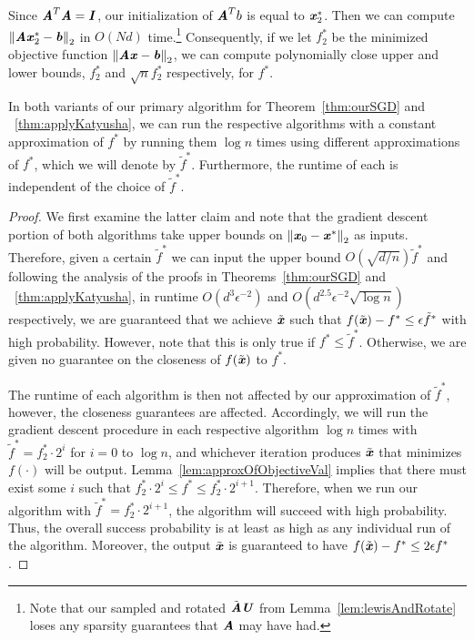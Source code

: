 Since $\AA^T \AA = \II$, our initialization of $\AA^T b$ is equal to $\xx_2^*$. Then we can compute $\norme{\AA\xx_2^* - \bb}$ in $O(Nd)$ time.\footnote{Note that our sampled and rotated $\tilde{\AA}\UU$ from Lemma~\ref{lem:lewisAndRotate} loses any sparsity guarantees that $\AA$ may have had.} Consequently, if we let $f_2^*$ be the minimized objective function $\norme{\AA\xx - \bb}$, we can compute polynomially close upper and lower bounds, $f_2^*$ and $\sqrt{n}f_2^*$ respectively, for $f^*$.

\begin{lemma}\label{lem:binarySearch}
	In both variants of our primary algorithm for Theorem~\ref{thm:ourSGD} and ~\ref{thm:applyKatyusha}, we can run the respective algorithms with a constant approximation of $f^*$ by running them $\log{n}$ times using different approximations of $f^*$, which we will denote by $\tilde{f}^*$.
	Furthermore, the runtime of each is independent of the choice of $\tilde{f}^*$.
\end{lemma}

\begin{proof}
	We first examine the latter claim and note that the gradient descent portion of both algorithms take upper bounds on $\norme{\xx_0 - \xx^*}$ as inputs.
	Therefore, given a certain $\tilde{f}^*$ we can input the upper bound $O(\sqrt{d/n})\tilde{f}^*$ and following the analysis of the proofs in Theorems~\ref{thm:ourSGD} and ~\ref{thm:applyKatyusha},
	in runtime $O(d^3\epsilon^{-2})$ and $O\left(d^{2.5}\epsilon^{-2} \sqrt{\log{n}}\right)$ respectively,
	we are guaranteed that we achieve $\tilde{\xx}$ such that $f(\tilde{\xx}) - f^* \leq \epsilon \tilde{f}^*$ with high probability.
	However, note that this is only true if $f^* \leq \tilde{f}^*$.
	Otherwise, we are given no guarantee on the closeness of $f(\tilde{\xx})$ to $f^*$.
	
	The runtime of each algorithm is then not affected by our approximation of $\tilde{f}^*$, however, the closeness guarantees are affected.
	Accordingly, we will run the gradient descent procedure in each respective algorithm $\log {n}$ times with $\tilde{f}^* = f_2^* \cdot 2^i$ for $i = 0$ to $\log {n}$, and whichever iteration produces $\tilde{\xx}$ that minimizes $f(\cdot)$ will be output. Lemma~\ref{lem:approxOfObjectiveVal} implies that there must exist some $i$ such that $f_2^* \cdot 2^i \leq  f^* \leq f_2^* \cdot 2^{i+1}$. Therefore, when we run our algorithm with $\tilde{f}^* = f_2^* \cdot 2^{i+1}$, the algorithm will succeed with high probability. Thus, the overall success probability is at least as high as any individual run of the algorithm. Moreover, the output $\tilde{\xx}$ is guaranteed to have $f(\tilde{\xx}) - f^* \leq 2\epsilon {f}^*$.
\end{proof}

